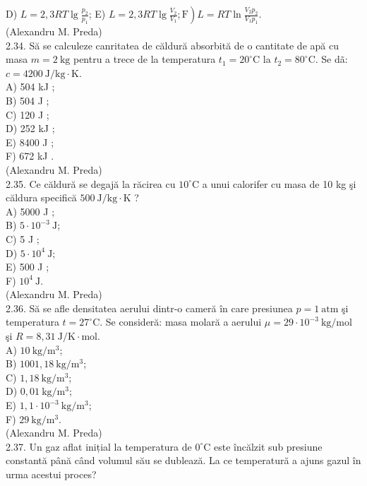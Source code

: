 \documentclass[10pt]{article}
\begin{document}
D) $L=2,3 R T \lg \frac{p_{2}}{p_{1}}$; E) $\left.L=2,3 R T \lg \frac{V_{2}}{V_{1}} ; \mathrm{F}\right) L=R T \ln \frac{V_{2} p_{2}}{V_{1} p_{1}}$.\\
(Alexandru M. Preda)\\
2.34. Să se calculeze canritatea de căldură absorbită de o cantitate de apă cu masa $m=2 \mathrm{~kg}$ pentru a trece de la temperatura $t_{1}=20^{\circ} \mathrm{C}$ la $t_{2}=80^{\circ} \mathrm{C}$. Se dã: $c=4200 \mathrm{~J} / \mathrm{kg} \cdot \mathrm{K}$.\\
A) 504 kJ ;\\
B) 504 J ;\\
C) 120 J ;\\
D) 252 kJ ;\\
E) 8400 J ;\\
F) 672 kJ .\\
(Alexandru M. Preda)\\
2.35. Ce căldură se degajă la răcirea cu $10^{\circ} \mathrm{C}$ a unui calorifer cu masa de 10 kg şi căldura specifică $500 \mathrm{~J} / \mathrm{kg} \cdot \mathrm{K}$ ?\\
A) 5000 J ;\\
B) $5 \cdot 10^{-3} \mathrm{~J}$;\\
C) 5 J ;\\
D) $5 \cdot 10^{4} \mathrm{~J}$;\\
E) 500 J ;\\
F) $10^{4} \mathrm{~J}$.\\
(Alexandru M. Preda)\\
2.36. Să se afle densitatea aerului dintr-o cameră în care presiunea $p=1 \mathrm{~atm}$ şi temperatura $t=27^{\circ} \mathrm{C}$. Se consideră: masa molară a aerului $\mu=29 \cdot 10^{-3} \mathrm{~kg} / \mathrm{mol}$ şi $R=8,31 \mathrm{~J} / \mathrm{K} \cdot \mathrm{mol}$.\\
A) $10 \mathrm{~kg} / \mathrm{m}^{3}$;\\
B) $1001,18 \mathrm{~kg} / \mathrm{m}^{3}$;\\
C) $1,18 \mathrm{~kg} / \mathrm{m}^{3}$;\\
D) $0,01 \mathrm{~kg} / \mathrm{m}^{3}$;\\
E) $1,1 \cdot 10^{-3} \mathrm{~kg} / \mathrm{m}^{3}$;\\
F) $29 \mathrm{~kg} / \mathrm{m}^{3}$.\\
(Alexandru M. Preda)\\
2.37. Un gaz aflat inițial la temperatura de $0^{\circ} \mathrm{C}$ este încălzit sub presiune constantă până când volumul său se dublează. La ce temperatură a ajuns gazul în urma acestui proces?\\
\end{document}
